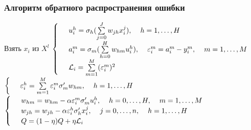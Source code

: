 \documentclass[10pt]{beamer}
\begin{document}
\begin{frame}\frametitle{Алгоритм обратного распространения ошибки}
  \begin{algorithmic}[1]
       \State Взять $x_i$ из $X^l$
       \State 	$\begin{cases}
	\hspace{5mm} u^h_i = \sigma_h (\sum\limits_{j=0}^J w_{jh} x_i^j), \hspace{4mm} h = 1, \dots, H\\
	\hspace{5mm} a^m_i = \sigma_m (\sum\limits_{h=0}^H w_{hm} u_i^h), \hspace{4mm} \varepsilon_i^m = a_i^m - y_i^m, \hspace{4mm} m = 1, \dots, M\\
	\hspace{5mm} \mathcal{L}_i = \sum\limits_{m=1}^M (\varepsilon_i^m)^2\\
	\end{cases}$\\
	$\begin{cases} \hspace{5mm} \varepsilon_i^h = \sum\limits_{m=1}^M \varepsilon_i^m \sigma'_m w_{hm}, \hspace{4mm} h = 1, \dots, H\end{cases}$\\
	$\begin{cases} \hspace{5mm} w_{hm} = w_{hm} - \alpha \varepsilon_i^m \sigma'_m u_i^h, \hspace{4mm} h = 0, \dots, H, \hspace{4mm} m = 1, \dots, M\\
	\hspace{5mm} w_{jh} = w_{jh} - \alpha \varepsilon_i^h \sigma'_h x_i^j, \hspace{4mm} j = 0, \dots, n, \hspace{4mm} h = 1, \dots, H\\
	\hspace{5mm} Q = (1 - \eta)Q + \eta \mathcal{L}_i \end{cases}$
     \EndRepeat
    \EndFunction
  \end{algorithmic}  
  
\end{frame}
\end{document}
